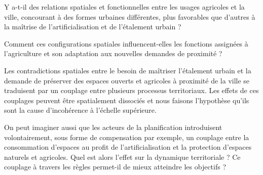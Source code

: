 	



Y a-t-il des relations spatiales et fonctionnelles entre les usages agricoles
et la ville, concourant à des formes urbaines différentes,
plus favorables que d'autres à la maîtrise de l'artificialisation
et de l'étalement urbain ?

Comment ces configurations spatiales influencent-elles les fonctions
assignées à l'agriculture et son adaptation aux nouvelles demandes de proximité ?



Les contradictions spatiales entre le besoin de maîtriser l'étalement urbain
et la demande de préserver des espaces ouverts et agricoles à proximité de la ville
se traduisent par un couplage entre plusieurs processus territoriaux.
Les effets de ces couplages peuvent être spatialement dissociés
et nous faisons l'hypothèse qu'ils sont la cause d'incohérence à l'échelle supérieure.

On peut imaginer aussi que les acteurs de la planification
introduisent volontairement, sous forme de compensation par exemple, un couplage
entre la consommation d'espaces au profit de l'artificialisation
et la protection d'espaces naturels et agricoles. Quel est alors
l'effet sur la dynamique territoriale ? Ce couplage
à travers les règles permet-il de mieux atteindre les objectifs ?

